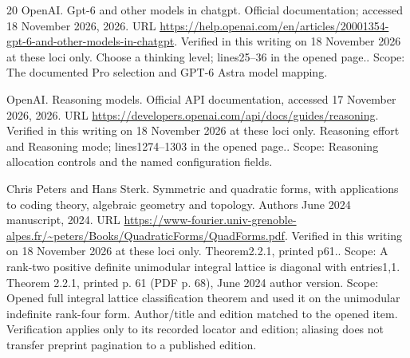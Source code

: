 \documentclass[11pt,a4paper]{article}
\theoremstyle{definition}
\begin{document}
\begin{thebibliography}{20}
{OpenAI}.
\newblock Gpt-6 and other models in chatgpt.
\newblock Official documentation;\allowbreak{} accessed 18 November 2026,
  2026{}.
\newblock URL
  \url{https://help.openai.com/en/articles/20001354-gpt-6-and-other-models-in-chatgpt}.
\newblock Verified in this writing on 18 November 2026 at these loci only.
  Choose a thinking level;\allowbreak{} lines25–36 in the opened page.. Scope: The
  documented Pro selection and GPT-6 Astra model mapping.

{OpenAI}.
\newblock Reasoning models.
\newblock Official API documentation, accessed 17 November 2026,
  2026{}.
\newblock URL \url{https://developers.openai.com/api/docs/guides/reasoning}.
\newblock Verified in this writing on 18 November 2026 at these loci only.
  Reasoning effort and Reasoning mode;\allowbreak{} lines1274–1303 in the opened page..
  Scope: Reasoning allocation controls and the named configuration fields.

Chris Peters and Hans Sterk.
\newblock Symmetric and quadratic forms, with applications to coding theory,
  algebraic geometry and topology.
\newblock Authors\textquotesingle{} June 2024 manuscript, 2024.
\newblock URL
  \url{https://www-fourier.univ-grenoble-alpes.fr/~peters/Books/QuadraticForms/QuadForms.pdf}.
\newblock Verified in this writing on 18 November 2026 at these loci only.
  Theorem2.2.1, printed p61.. Scope: A rank-two positive definite unimodular
  integral lattice is diagonal with entries1,1. Theorem 2.2.1, printed p. 61
  (PDF p. 68), June 2024 author version. Scope: Opened full integral lattice
  classification theorem and used it on the unimodular indefinite rank-four
  form. Author/title and edition matched to the opened item. Verification
  applies only to its recorded locator and edition;\allowbreak{} aliasing does not transfer
  preprint pagination to a published edition.


\end{thebibliography}
\end{document}
